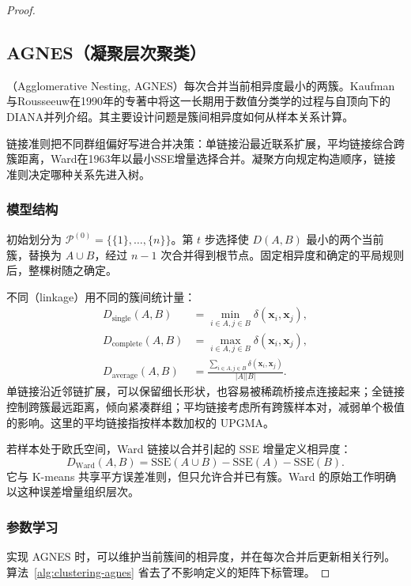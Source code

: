 \begin{proof}
\subsection{AGNES（凝聚层次聚类）}
\label{sec:clustering-agnes}

（Agglomerative Nesting, AGNES）每次合并当前相异度最小的两簇。Kaufman与Rousseeuw在1990年的专著中将这一长期用于数值分类学的过程与自顶向下的DIANA并列介绍。其主要设计问题是簇间相异度如何从样本关系计算。

链接准则把不同群组偏好写进合并决策：单链接沿最近联系扩展，平均链接综合跨簇距离，Ward在1963年以最小SSE增量选择合并。凝聚方向规定构造顺序，链接准则决定哪种关系先进入树。

\subsubsection{模型结构}

初始划分为 $\mathcal{P}^{(0)}=\{\{1\},\ldots,\{n\}\}$。第 $t$ 步选择使 $D(A,B)$ 最小的两个当前簇，替换为 $A\cup B$，经过 $n-1$ 次合并得到根节点。固定相异度和确定的平局规则后，整棵树随之确定。

不同（linkage）用不同的簇间统计量：
\begin{align*}
 D_{\mathrm{single}}(A,B)
   &=\min_{i\in A,j\in B}\delta(\bm{x}_i,\bm{x}_j),\\
 D_{\mathrm{complete}}(A,B)
   &=\max_{i\in A,j\in B}\delta(\bm{x}_i,\bm{x}_j),\\
 D_{\mathrm{average}}(A,B)
   &=\frac{\sum_{i\in A,j\in B}\delta(\bm{x}_i,\bm{x}_j)}
   {|A||B|}.
\end{align*}
单链接沿近邻链扩展，可以保留细长形状，也容易被稀疏桥接点连接起来；全链接控制跨簇最远距离，倾向紧凑群组；平均链接考虑所有跨簇样本对，减弱单个极值的影响。这里的平均链接指按样本数加权的 UPGMA。

若样本处于欧氏空间，Ward 链接以合并引起的 SSE 增量定义相异度：
\[
 D_{\mathrm{Ward}}(A,B)
 =\mathrm{SSE}(A\cup B)-\mathrm{SSE}(A)-\mathrm{SSE}(B).
\]
它与 K-means 共享平方误差准则，但只允许合并已有簇。Ward 的原始工作明确以这种误差增量组织层次。

\subsubsection{参数学习}

实现 AGNES 时，可以维护当前簇间的相异度，并在每次合并后更新相关行列。算法~\ref{alg:clustering-agnes} 省去了不影响定义的矩阵下标管理。


\end{proof}
